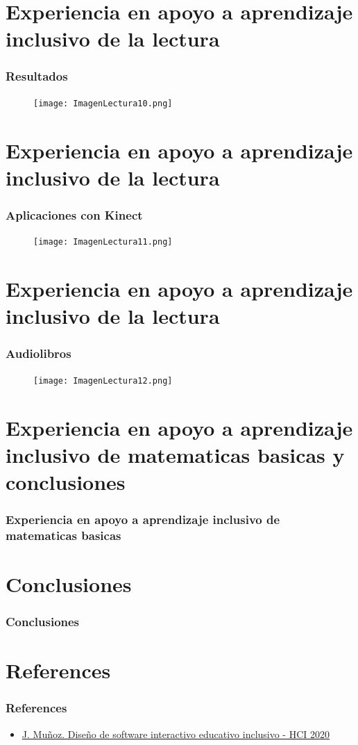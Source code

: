 \documentclass[11pt]{beamer}
\begin{document}
\section{Experiencia en apoyo a aprendizaje inclusivo de la lectura}
\begin{frame}
\frametitle{Resultados}
    \begin{figure}
    \centering
     \texttt{[image: ImagenLectura10.png]}
    \end{figure}
\end{frame}

\section{Experiencia en apoyo a aprendizaje inclusivo de la lectura}
\begin{frame}
\frametitle{Aplicaciones con Kinect}
    \begin{figure}
    \centering
     \texttt{[image: ImagenLectura11.png]}
    \end{figure}
\end{frame}

\section{Experiencia en apoyo a aprendizaje inclusivo de la lectura}
\begin{frame}
\frametitle{Audiolibros}
    \begin{figure}
    \centering
     \texttt{[image: ImagenLectura12.png]}
    \end{figure}
\end{frame}

\section{Experiencia en apoyo a aprendizaje inclusivo de matematicas basicas y conclusiones}
\begin{frame}
\frametitle{Experiencia en apoyo a aprendizaje inclusivo de matematicas basicas}
\end{frame}

\section{Conclusiones}
\begin{frame}
\frametitle{Conclusiones}
\end{frame}

\section{References}
\begin{frame}
\frametitle{References}
\begin{itemize}
\item \href{https://www.youtube.com/watch?v=F0nOl4GRfC4&t=1577s}{J. Muñoz. Diseño de software interactivo educativo inclusivo - HCI 2020}
\end{itemize}
\end{frame}
\end{document}
